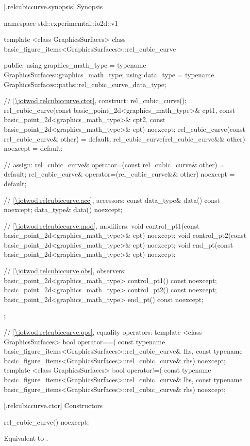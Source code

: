  [\iotwod.relcubiccurve.synopsis] {Synopsis}
\begin{codeblock}
namespace std::experimemtal::io2d::v1 {
  template <class GraphicsSurfaces>
  class basic_figure_items<GraphicsSurfaces>::rel_cubic_curve {
  public:
    using graphics_math_type = typename GraphicsSurfaces::graphics_math_type;
    using data_type =
      typename GraphicsSurfaces::paths::rel_cubic_curve_data_type;

    // \ref{\iotwod.relcubiccurve.ctor}, construct:
    rel_cubic_curve();
    rel_cubic_curve(const basic_point_2d<graphics_math_type>& cpt1,
       const basic_point_2d<graphics_math_type>& cpt2,
       const basic_point_2d<graphics_math_type>& ept) noexcept;
    rel_cubic_curve(const rel_cubic_curve& other) = default;
    rel_cubic_curve(rel_cubic_curve&& other) noexcept = default;

    // assign:
    rel_cubic_curve& operator=(const rel_cubic_curve& other) = default;
    rel_cubic_curve& operator=(rel_cubic_curve&& other) noexcept = default;

    // \ref{\iotwod.relcubiccurve.acc}, accessors:
    const data_type& data() const noexcept;
    data_type& data() noexcept;

    // \ref{\iotwod.relcubiccurve.mod}, modifiers:
    void control_pt1(const basic_point_2d<graphics_math_type>& cpt) noexcept;
    void control_pt2(const basic_point_2d<graphics_math_type>& cpt) noexcept;
    void end_pt(const basic_point_2d<graphics_math_type>& ept) noexcept;

    // \ref{\iotwod.relcubiccurve.obs}, observers:
    basic_point_2d<graphics_math_type> control_pt1() const noexcept;
    basic_point_2d<graphics_math_type> control_pt2() const noexcept;
    basic_point_2d<graphics_math_type> end_pt() const noexcept;
  };

  // \ref{\iotwod.relcubiccurve.ops}, equality operators:
  template <class GraphicsSurfaces>
  bool operator==(
    const typename basic_figure_items<GraphicsSurfaces>::rel_cubic_curve& lhs,
    const typename basic_figure_items<GraphicsSurfaces>::rel_cubic_curve& rhs) 
    noexcept;  
  template <class GraphicsSurfaces>
  bool operator!=(
    const typename basic_figure_items<GraphicsSurfaces>::rel_cubic_curve& lhs,
    const typename basic_figure_items<GraphicsSurfaces>::rel_cubic_curve& rhs) 
    noexcept;  
}
\end{codeblock}

 [\iotwod.relcubiccurve.ctor] {Constructors}%

%
\begin{itemdecl}
rel_cubic_curve() noexcept;
\end{itemdecl}
\begin{itemdescr}
\pnum
\effects
Equivalent to .
\end{itemdescr}

